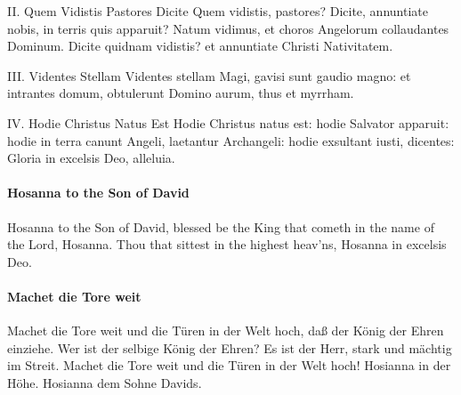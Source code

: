 \documentclass[11pt, ngermanm, titlepage]{article}
\begin{document}
\begin{multicols}{2}
	II. Quem Vidistis Pastores Dicite\newline
	Quem vidistis, pastores? Dicite,\newline
	annuntiate nobis, in terris quis apparuit?\newline
	Natum vidimus,\newline
	et choros Angelorum collaudantes Dominum.\newline
	Dicite quidnam vidistis?\newline
	et annuntiate Christi Nativitatem.\newline
	
	III. Videntes Stellam\newline
	Videntes stellam Magi,\newline
	gavisi sunt gaudio magno:\newline
	et intrantes domum,\newline
	obtulerunt Domino aurum, thus et myrrham.\newline
	
	IV. Hodie Christus Natus Est\newline
	Hodie Christus natus est:\newline
	hodie Salvator apparuit:\newline
	hodie in terra canunt Angeli,\newline
	laetantur Archangeli:\newline
	hodie exsultant iusti, dicentes:\newline
	Gloria in excelsis Deo, alleluia.\newline
	
		\paragraph{Hosanna to the Son of David\newline}
	Hosanna to the Son of David,\newline
	blessed be the King that cometh\newline
	in the name of the Lord, Hosanna.\newline
	Thou that sittest in the highest heav’ns,\newline
	Hosanna in excelsis Deo.
	
	\paragraph{Machet die Tore weit\newline}
	Machet die Tore weit\newline
	und die Türen in der Welt hoch,\newline
	daß der König der Ehren einziehe.\newline
	Wer ist der selbige König der Ehren?\newline
	Es ist der Herr,\newline
	stark und mächtig im Streit.\newline
	Machet die Tore weit\newline
	und die Türen in der Welt hoch!\newline
	Hosianna in der Höhe.\newline
	Hosianna dem Sohne Davids.
	

\end{multicols}
\end{document}
